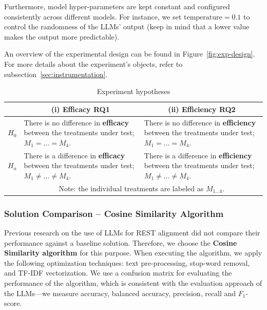 \documentclass[conference]{IEEEtran}
\renewcommand{\arraystretch}{1.2}
\begin{document}
Furthermore, model hyper-parameters are kept constant and configured consistently across different models. For instance, we set $\text{temperature} = 0.1$ to control the randomness of the LLMs' output (keep in mind that a lower value makes the output more predictable).

An overview of the experimental design can be found in Figure~\ref{fig:exp-design}. For more details about the experiment's objects, refer to subsection~\ref{sec:instrumentation}.


\newcommand{\equalM}{$M_{1} = \dots = M_{4}$}
\newcommand{\notEqualM}{$M_{1} \neq \dots \neq M_{4}$}

\begin{table}[h]
    \centering
    \caption{Experiment hypotheses}
    \renewcommand{\arraystretch}{1.65} %
    \begin{tabular}{@{} c p{3.5cm} p{3.5cm} @{}}
    \toprule
    &\multicolumn{1}{c}{\textbf{(i) Efficacy RQ1}}
    &\multicolumn{1}{c}{\textbf{(ii) Efficiency RQ2}} \\
    \midrule
    $H_{0}$ %
    & There is no difference in \textbf{efficacy} between the treatments
    under test; \equalM.
    & There is no difference in \textbf{efficiency} between the treatments
    under test; \equalM.\\
    $H_{a}$ %
    & There is a difference in \textbf{efficacy} between the treatments
    under test; \notEqualM.
    & There is a difference in \textbf{efficiency} between the treatments
    under test; \notEqualM.\\
    \bottomrule
    &\multicolumn{2}{c}{Note: the individual treatments are labeled as $M_{1\dots4}$.} \\
    \end{tabular}
    \label{tab:hypothesis}
\end{table}

\subsubsection{Solution Comparison -- Cosine Similarity Algorithm}

Previous research on the use of LLMs for REST alignment did not compare their performance against a baseline solution. Therefore, we choose the \textbf{Cosine Similarity algorithm} for this purpose. When executing the algorithm, we apply the following optimization techniques: text pre-processing, stop-word removal, and TF-IDF vectorization. We use a confusion matrix for evaluating the performance of the algorithm, which is consistent with the evaluation approach of the LLMs---we measure accuracy, balanced accuracy, precision, recall and $F_1$-score.
\end{document}

